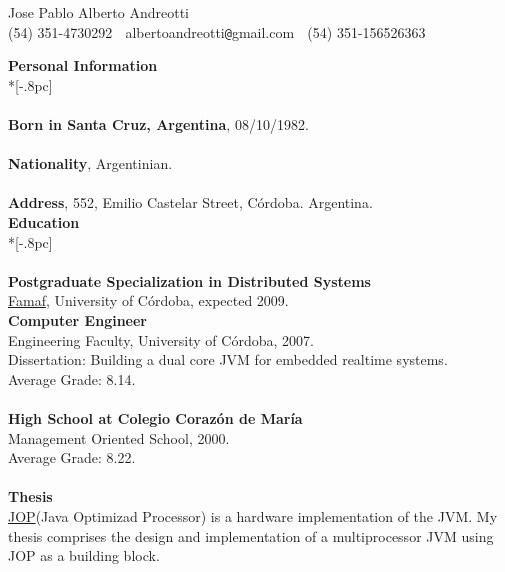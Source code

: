 \documentclass[a4paper,11pt,english]{article}
\begin{document}
\begin{center}
{\Large Jose Pablo Alberto Andreotti} \\[.5pc]
(54) 351-4730292 $\;$ albertoandreotti\verb|@|gmail.com $\;$ (54) 351-156526363 \\[3pc]
\end{center}
{\large \bf Personal Information} \\*[-.8pc]
\underline{\hspace{6in}} \\
\\
{\bf Born in Santa Cruz, Argentina}, 08/10/1982.\\
\\
{\bf Nationality}, Argentinian.\\
\\
{\bf Address}, 552, Emilio Castelar Street, C\'ordoba. Argentina.\\

{\large \bf Education} \\*[-.8pc]
\underline{\hspace{6in}} \\
\\
{\bf Postgraduate Specialization in Distributed Systems}\\
\href{http://www.famaf.unc.edu.ar/}{Famaf}, University of C\'ordoba, expected 2009.
\\

{\bf Computer Engineer}\\
Engineering Faculty, University of C\'ordoba, 2007.\\
Dissertation: Building a dual core JVM for embedded realtime systems.\\
Average Grade: 8.14. \\
\\
{\bf High School at Colegio Coraz\'on de Mar\'ia}\\
Management Oriented School, 2000.\\
Average Grade: 8.22.\\
\\
{\bf Thesis} \\
\href{http://www.jopdesign.com}{JOP}(Java Optimizad Processor) is a hardware implementation of the JVM. My thesis 
comprises the design and implementation of a multiprocessor JVM using JOP as a building block.\\
\end{document}
